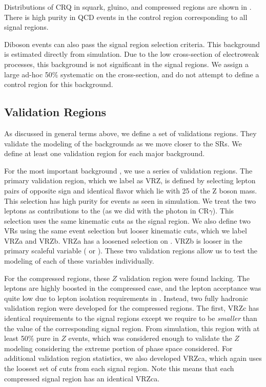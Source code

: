 Distributions of CRQ in squark, gluino, and compressed regions are shown in .
There is high purity in QCD events in the control region corresponding to all signal regions.

Diboson events can also pass the signal region selection criteria.
This background is estimated directly from simulation.
Due to the low cross-section of electroweak processes, this background is not significant in the signal regions.
We assign a large ad-hoc 50\% systematic on the cross-section, and do not attempt to define a control region for this background.



\subsection{Validation Regions}

As discussed in general terms above, we define a set of validations regions.
They validate the modeling of the backgrounds as we move closer to the SRs.
We define at least one validation region for each major background.

For the most important background \Zvv, we use a series of validation regions.
The primary validation region, which we label as VRZ, is defined by selecting lepton pairs of opposite sign and identical flavor which lie with 25 \GeV of the Z boson mass.
This selection has high purity for \Zll events as seen in simulation.
We treat the two leptons as contributions to the \met (as we did with the photon in CR$\gamma$).
This selection uses the same kinematic cuts as the signal region.
We also define two VRs using the same event selection but looser kinematic cuts, which we label VRZa and VRZb.
VRZa has a loosened selection on .
VRZb is looser in the primary scaleful variable  ( or ).
These two validation regions allow us to test the modeling of each of these variables individually.

For the compressed regions, these $Z$ validation region were found lacking.
The leptons are highly boosted in the compressed case, and the lepton acceptance was quite low due to lepton isolation requirements in \deltaR.
Instead, two fully hadronic validation region were developed for the compressed regions.
The first, VRZc has identical requirements to the signal regions except we require \dphiISR to be \textit{smaller} than the value of the corresponding signal region.
From simulation, this region with at least 50\% pure in $Z$ events, which was considered enough to validate the $Z$ modeling considering the extreme portion of phase space considered.
For additional validation region statistics, we also developed VRZca, which again uses the loosest set of cuts from each signal region.
Note this means that each compressed signal region has an identical VRZca.


